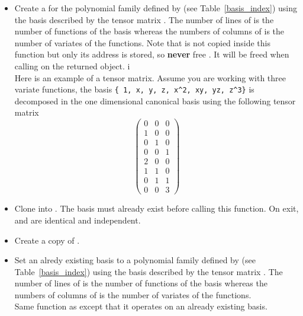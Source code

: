 \begin{itemize}
\item {}
  \sshortdescribe Create a \PnlBasis for the polynomial family
  defined by  (see Table~\ref{basis_index}) using the basis
  described by the tensor matrix . The number of lines of  is
  the number of functions of the basis whereas the numbers of columns of
   is the number of variates of the functions.
  Note that  is not copied inside this function but only its address is
  stored, so {\bf never} free . It will be freed when calling
   on the returned object. i\\
  Here is an example of a tensor matrix. Assume you are working with three
  variate functions, the basis \verb!{ 1, x, y, z, x^2, xy, yz, z^3}! is
  decomposed in the one dimensional canonical basis using the following tensor
  matrix
  \[ \left(
    \begin{array}{ccc}
      0 & 0 & 0 \\
      1 & 0 & 0 \\
      0 & 1 & 0 \\
      0 & 0 & 1 \\
      2 & 0 & 0 \\
      1 & 1 & 0 \\
      0 & 1 & 1\\
      0 & 0 & 3
    \end{array}
  \right) \]

\item {}
  \sshortdescribe Clone  into . The basis  must
  already exist before calling this function. On exit,  and 
  are identical and independent.
\item {}
  \sshortdescribe Create a copy of .
\item {}
  \sshortdescribe Set an alredy existing basis  to a polynomial family
  defined by  (see Table~\ref{basis_index}) using the basis
  described by the tensor matrix . The number of lines of  is
  the number of functions of the basis whereas the numbers of columns of
   is the number of variates of the functions. \\
  Same function as  except that it
  operates on an already existing basis.


\end{itemize}
